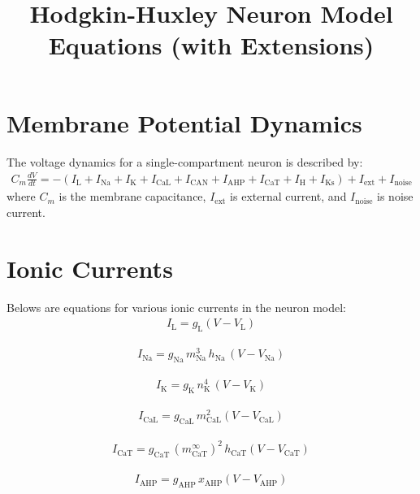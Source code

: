 \documentclass{article}
\begin{document}
\title{Hodgkin-Huxley Neuron Model Equations (with Extensions)}
\author{}
\date{}
\maketitle

\section{Membrane Potential Dynamics}
The voltage dynamics for a single-compartment neuron is described by:
\begin{align*}
C_m \frac{dV}{dt} = -\left( I_\mathrm{L} + I_\mathrm{Na} + I_\mathrm{K} + I_\mathrm{CaL} + I_\mathrm{CAN} + I_\mathrm{AHP} + I_\mathrm{CaT} + I_\mathrm{H} + I_\mathrm{Ks} \right) + I_\mathrm{ext} + I_\mathrm{noise} 
\end{align*}
where $C_m$ is the membrane capacitance, $I_\mathrm{ext}$ is external current, and $I_\mathrm{noise}$ is noise current.
\section{Ionic Currents}

Belows are equations for various ionic currents in the neuron model:
\begin{align}
I_\mathrm{L} = g_\mathrm{L}(V - V_\mathrm{L})
\end{align}

\begin{align}
I_\mathrm{Na} = g_\mathrm{Na} \, m_\mathrm{Na}^3 \, h_\mathrm{Na} \, (V - V_\mathrm{Na})
\end{align}

\begin{align}
I_\mathrm{K} = g_\mathrm{K} \, n_\mathrm{K}^4 \, (V - V_\mathrm{K})
\end{align}

\begin{align}
I_\mathrm{CaL} = g_\mathrm{CaL} \, m_\mathrm{CaL}^2 (V - V_\mathrm{CaL})
\end{align}

\begin{align}
I_\mathrm{CaT} = g_\mathrm{CaT} \, (m_\mathrm{CaT}^{\infty})^2 \, h_\mathrm{CaT} (V - V_\mathrm{CaT})
\end{align}

\begin{align}
I_\mathrm{AHP} = g_\mathrm{AHP} \, x_\mathrm{AHP} (V - V_\mathrm{AHP})
\end{align}
\end{document}
